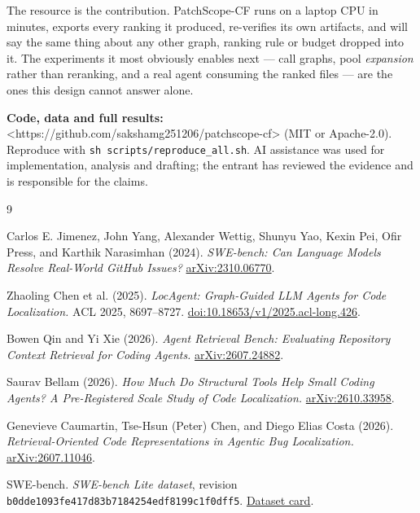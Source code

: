 \documentclass[10pt,a4paper]{article}
\begin{document}
The resource is the contribution. PatchScope-CF runs on a laptop CPU in minutes, exports every ranking it produced, re-verifies its own artifacts, and will say the same thing about any other graph, ranking rule or budget dropped into it. The experiments it most obviously enables next --- call graphs, pool \textit{expansion} rather than reranking, and a real agent consuming the ranked files --- are the ones this design cannot answer alone.

\textbf{Code, data and full results:} <https://github.com/sakshamg251206/patchscope-cf> (MIT or Apache-2.0). Reproduce with \texttt{sh scripts/reproduce\_all.sh}. AI assistance was used for implementation, analysis and drafting; the entrant has reviewed the evidence and is responsible for the claims.

\begin{thebibliography}{9}

 Carlos E. Jimenez, John Yang, Alexander Wettig, Shunyu Yao, Kexin Pei, Ofir Press, and Karthik Narasimhan (2024). \textit{SWE-bench: Can Language Models Resolve Real-World GitHub Issues?} \href{https://arxiv.org/abs/2310.06770}{arXiv:2310.06770}.

 Zhaoling Chen et al. (2025). \textit{LocAgent: Graph-Guided LLM Agents for Code Localization.} ACL 2025, 8697–8727. \href{https://aclanthology.org/2025.acl-long.426/}{doi:10.18653/v1/2025.acl-long.426}.

 Bowen Qin and Yi Xie (2026). \textit{Agent Retrieval Bench: Evaluating Repository Context Retrieval for Coding Agents.} \href{https://arxiv.org/abs/2607.24882}{arXiv:2607.24882}.

 Saurav Bellam (2026). \textit{How Much Do Structural Tools Help Small Coding Agents? A Pre-Registered Scale Study of Code Localization.} \href{https://arxiv.org/abs/2610.33958}{arXiv:2610.33958}.

 Genevieve Caumartin, Tse-Hsun (Peter) Chen, and Diego Elias Costa (2026). \textit{Retrieval-Oriented Code Representations in Agentic Bug Localization.} \href{https://arxiv.org/abs/2607.11046}{arXiv:2607.11046}.

 SWE-bench. \textit{SWE-bench Lite dataset}, revision \texttt{b0dde1093fe417d83b\allowbreak{}7184254edf8199c1f0\allowbreak{}dff5}. \href{https://huggingface.co/datasets/SWE-bench/SWE-bench_Lite}{Dataset card}.

\end{thebibliography}
\end{document}
